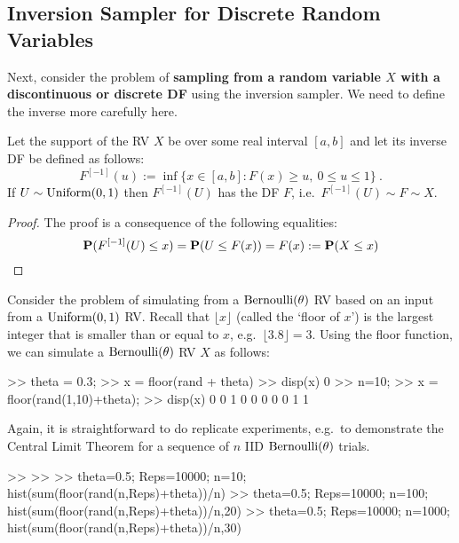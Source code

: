 \subsection{Inversion Sampler for Discrete Random Variables}\label{S:InvSDiscrete}
Next, consider the problem of {\bf sampling from a random variable $X$ with a discontinuous or discrete DF} using the inversion sampler.  We need to define the inverse more carefully here.
\begin{prop}
Let the support of the RV $X$ be over some real interval $[a,b]$ and let its inverse DF be defined as follows:
\[
F^{[-1]}(u) := \inf\{ x \in [a,b]: F(x) \geq u, \ 0 \leq u \leq 1 \} \ .
\]
If $U \sim \mbox{{\rm Uniform}}(0,1)$ then $F^{[-1]}(U)$ has the DF $F$, i.e.~$F^{[-1]}(U) \sim F \sim X$.
\end{prop}
\begin{proof}
The proof is a consequence of the following equalities:
\[
\mathbf{P}(F^{[-1]}(U) \leq x) = \mathbf{P}(U \leq F(x)) = F(x) := \mathbf{P}(X \leq x)
\]
\end{proof}


\begin{simulation}[$\bernoulli(\theta)$]\label{SIM:Bernoulli}
Consider the problem of simulating from a $\bernoulli(\theta)$ RV based on an input from  a $\mbox{{\rm Uniform}}(0,1)$ RV.  Recall that $\lfloor x \rfloor$ (called the `floor of $x$') is the largest integer that is smaller than or equal to $x$, e.g.~$\lfloor 3.8 \rfloor = 3$.  Using the floor function, we can simulate a $\bernoulli(\theta)$ RV $X$ as follows:
\begin{VrbM}
>>  theta = 0.3;		%
>> x = floor(rand + theta)	%
>> disp(x) %
     0
>> n=10;  %
>> x = floor(rand(1,10)+theta); %
>> disp(x) %
     0     0     1     0     0     0     0     0     1     1
\end{VrbM}
\end{simulation}
Again, it is straightforward to do replicate experiments, e.g.~to demonstrate the Central Limit Theorem for a sequence of $n$ IID $\bernoulli(\theta)$ trials.
\begin{VrbM}
>> %
>> %
>> theta=0.5; Reps=10000; n=10; hist(sum(floor(rand(n,Reps)+theta))/n)
>> theta=0.5; Reps=10000; n=100; hist(sum(floor(rand(n,Reps)+theta))/n,20)
>> theta=0.5; Reps=10000; n=1000; hist(sum(floor(rand(n,Reps)+theta))/n,30)
\end{VrbM}

